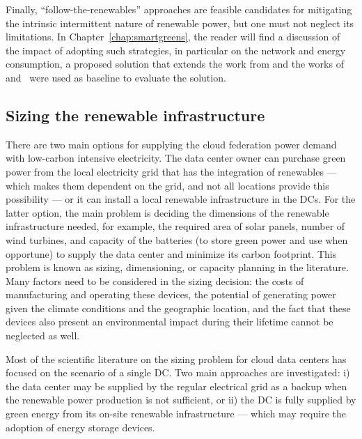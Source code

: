 Finally, ``follow-the-renewables'' approaches are feasible candidates for mitigating the intrinsic intermittent nature of renewable power, but one must not neglect its limitations. In Chapter~\ref{chap:smartgreens}, the reader will find a discussion of the impact of adopting such strategies, in particular on the network and energy consumption, a proposed solution that extends the work from \citet{NEMESIS} and the works of ~\citet{XU2020191} and~\citet{ALI2021110907} were used as baseline to evaluate the solution.


\subsection{Sizing the renewable infrastructure}


\label{sec:sizing}


There are two main options for supplying the cloud federation power demand with low-carbon intensive electricity. The data center owner can purchase green power from the local electricity grid that has the integration of renewables  --- which makes them dependent on the grid, and not all locations provide this possibility  --- or it can install a local renewable infrastructure in the DCs. For the latter option, the main problem is deciding the dimensions of the renewable infrastructure needed, for example, the required area of solar panels, number of wind turbines, and capacity of the batteries  (to store green power and use when opportune) to supply the data center and minimize its carbon footprint. This problem is known as sizing, dimensioning, or capacity planning in the literature. Many factors need to be considered in the sizing decision: the costs of manufacturing and operating these devices, the potential of generating power given the climate conditions and the geographic location, and the fact that these devices also present an environmental impact during their lifetime cannot be neglected as well.


Most of the scientific literature on the sizing problem for cloud data centers has focused on the scenario of a single DC. Two main approaches are investigated: i) the data center may be supplied by the regular electrical grid as a backup when the renewable power production is not sufficient, or ii) the DC is fully supplied by green energy from its on-site renewable infrastructure --- which may require the adoption of energy storage devices.


